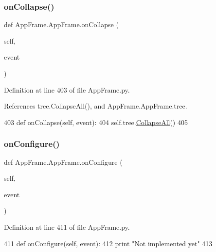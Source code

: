 \subsubsection{\texorpdfstring{on\+Collapse()}{onCollapse()}}
{\footnotesize\ttfamily def App\+Frame.\+App\+Frame.\+on\+Collapse (\begin{DoxyParamCaption}\item[{}]{self,  }\item[{}]{event }\end{DoxyParamCaption})}



Definition at line 403 of file App\+Frame.\+py.



References tree.\+Collapse\+All(), and App\+Frame.\+App\+Frame.\+tree.


\begin{DoxyCode}
403     \textcolor{keyword}{def }onCollapse(self, event):
404         self.tree.\hyperlink{namespacetree_a8440c45c468184b3cc385934d03bf96f}{CollapseAll}()
405         
\end{DoxyCode}
\mbox{\label{classAppFrame_1_1AppFrame_a42b5e1947e8d7ef528d158a15a8b081d}} 
\subsubsection{\texorpdfstring{on\+Configure()}{onConfigure()}}
{\footnotesize\ttfamily def App\+Frame.\+App\+Frame.\+on\+Configure (\begin{DoxyParamCaption}\item[{}]{self,  }\item[{}]{event }\end{DoxyParamCaption})}



Definition at line 411 of file App\+Frame.\+py.


\begin{DoxyCode}
411     \textcolor{keyword}{def }onConfigure(self, event):
412         \textcolor{keywordflow}{print} \textcolor{stringliteral}{"Not implemented yet"}
413         
\end{DoxyCode}
\mbox{\label{classAppFrame_1_1AppFrame_a55868f842496adbc598ea5a8e03a8a03}} 
